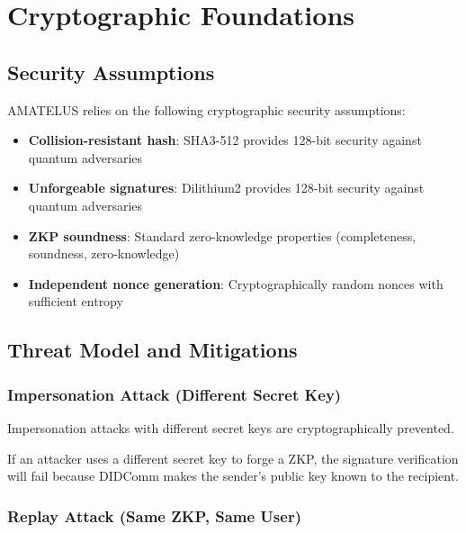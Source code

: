 \chapter{Cryptographic Foundations}

\section{Security Assumptions}

\begin{definition}
  \label{def:crypto-assumptions}
  AMATELUS relies on the following cryptographic security assumptions:
  \begin{itemize}
    \item \textbf{Collision-resistant hash}: SHA3-512 provides 128-bit security against quantum adversaries
    \item \textbf{Unforgeable signatures}: Dilithium2 provides 128-bit security against quantum adversaries
    \item \textbf{ZKP soundness}: Standard zero-knowledge properties (completeness, soundness, zero-knowledge)
    \item \textbf{Independent nonce generation}: Cryptographically random nonces with sufficient entropy
  \end{itemize}
  \leanok
\end{definition}

\section{Threat Model and Mitigations}

\subsection{Impersonation Attack (Different Secret Key)}

\begin{theorem}
  \label{thm:impersonation-resistance}
  Impersonation attacks with different secret keys are cryptographically prevented.

  If an attacker uses a different secret key to forge a ZKP, the signature verification will fail
  because DIDComm makes the sender's public key known to the recipient.
  \leanok
\end{theorem}

\subsection{Replay Attack (Same ZKP, Same User)}

